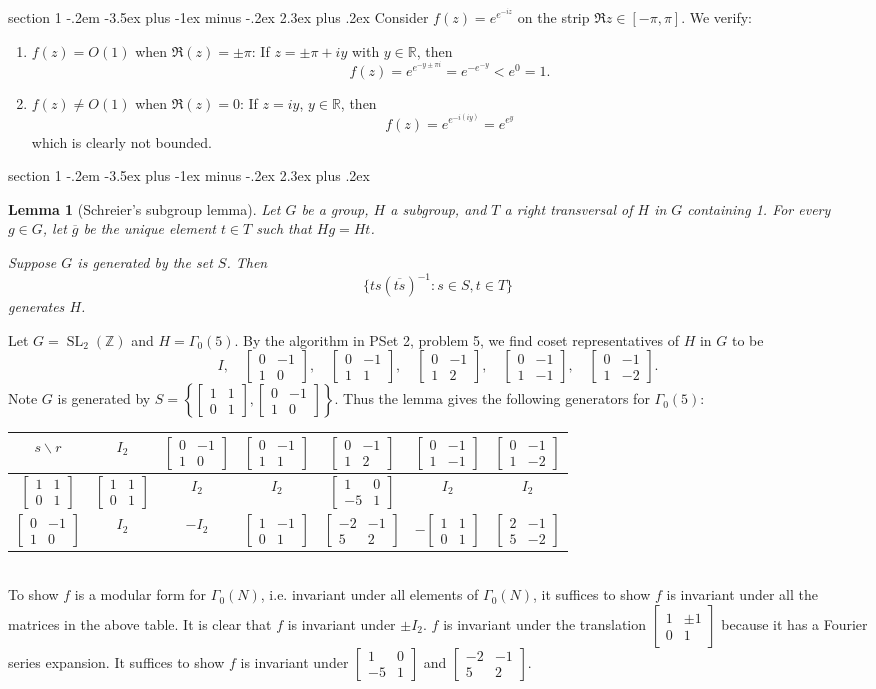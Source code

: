 \documentclass[12pt]{article}
\makeatletter
\theoremstyle{norm}
\newtheorem{lem}[thm]{Lemma}
\newcommand{\R}[0]{\mathbb{R}}
\newcommand{\Z}[0]{\mathbb{Z}}
\newcommand{\ga}[0]{\gamma}
\newcommand{\Ga}[0]{\Gamma}
\newcommand{\bc}[1]{\left\{ {#1} \right\}}
\newcommand{\SL}{\operatorname{SL}}
\newcommand{\ol}[1]{\overline{#1}}
\newcommand{\matt}[4]{
\left[
\begin{matrix}
{#1}&{#2}\\
{#3}&{#4}
\end{matrix}
\right]}
\newcommand{\smatt}[4]{
\left[
\begin{smallmatrix}
{#1}&{#2}\\
{#3}&{#4}
\end{smallmatrix}
\right]}
\newenvironment{problem}{\@startsection
       {section}
       {1}
       {-.2em}
       {-3.5ex plus -1ex minus -.2ex}
       {2.3ex plus .2ex}
       {\pagebreak[3]%
       \large\bf\noindent{Problem }
       }
       }
       {%
       }
\makeatother
\begin{document}
\begin{problem}{\it }
Consider $f(z)=e^{e^{-iz}}$ on the strip $\Re z\in [-\pi,\pi]$. We verify:
\begin{enumerate}
\item
$f(z)=O(1)$ when $\Re(z)=\pm \pi$: If $z=\pm \pi+iy$ with $y\in \R$, then
\[
f(z)=e^{e^{-y\pm \pi i}}
=e^{-e^{-y}}< e^0=1.
\]
\item
$f(z)\neq O(1)$ when $\Re(z)=0$: If $z=iy$, $y\in \R$, then
\[
f(z)=e^{e^{-i(iy)}}=e^{e^{y}}\]
which is clearly not bounded.
\end{enumerate}
\end{problem}
\begin{problem}{\it }
\begin{lem}[Schreier's subgroup lemma]
Let $G$ be a group, $H$ a subgroup, and $T$ a right transversal of $H$ in $G$ containing 1. For every $g\in G$, let $\ol{g}$ be the unique element $t\in T$ such that $Hg=Ht$.

Suppose $G$ is generated by the set $S$. Then 
\[
\{ts(\ol{ts})^{-1}:s\in S,t\in T\}
\] 
generates $H$.
\end{lem}
Let $G=\SL_2(\Z)$ and $H=\Ga_0(5)$. By the algorithm in PSet 2, problem 5, we find coset representatives of $H$ in $G$ to be
\[
I, \quad \matt 0{-1}10,\quad \matt0{-1}11,\quad \matt0{-1}12,\quad \matt 0{-1}1{-1},\quad \matt0{-1}1{-2}.
\]
Note $G$ is generated by $S=\bc{ \smatt 1101,\smatt0{-1}10}$. Thus the lemma gives the following generators for $\Ga_0(5)$:\\

\begin{tabular}{c|c|c|c|c|c|c}
$s\backslash r$ & $I_{2}$ & $\matt0{-1}10$ & $\matt0{-1}11$ & $\matt0{-1}12$ & $\matt0{-1}1{-1}$ & $\matt0{-1}1{-2}$\tabularnewline
\hline 
$\matt1101$ & $\matt1101$ & $I_{2}$ & $I_{2}$ & $\matt10{-5}1$ & $I_{2}$ & $I_{2}$\tabularnewline
\hline 
$\matt0{-1}10$ & $I_{2}$ & $-I_{2}$ & $\matt1{-1}01$ & $\matt{-2}{-1}52$ & $-\matt1101$ & $\matt2{-1}5{-2}$\tabularnewline
\end{tabular}\\

To show $f$ is a modular form for $\Ga_0(N)$, i.e. invariant under all elements of $\Ga_0(N)$, it suffices to show $f$ is invariant under all the matrices in the above table. It is clear that $f$ is invariant under $\pm I_2$. $f$ is invariant under the translation $\smatt 1{\pm1}01$ because it has a Fourier series expansion.
It suffices to show $f$ is invariant under $\smatt 10{-5}1$ and $\smatt {-2}{-1}52$.


\end{problem}
\end{document}

